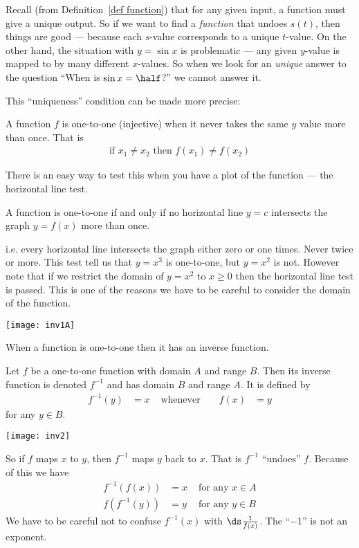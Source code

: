 Recall (from Definition~\ref{def function}) that for any given input, a function must
give a unique output. So if we want to find a \emph{function} that undoes $s(t)$, then
things are good --- because each $s$-value corresponds to a unique $t$-value. On the
other hand, the situation with $y=\sin x$ is problematic --- any given $y$-value is
mapped to by many different $x$-values. So when we look for an \emph{unique} answer to
the question ``When is $\sin x = \half$?'' we cannot answer it.

This ``uniqueness'' condition can be made more precise:
\begin{defn}\label{def_0_6_1}
 A function $f$ is one-to-one (injective) when it never takes the same $y$
value more than once. That is
\begin{align*}
  \mbox{if } x_1 \neq x_2 \mbox{ then } f(x_1) \neq f(x_2)
\end{align*}
\end{defn}
There is an easy way to test this when you have a plot of the function --- the
horizontal line test.
\begin{defn}\label{def_0_6_2}
 A function is one-to-one if and only if no horizontal line $y=c$ intersects
the graph $y=f(x)$ more than once.
\end{defn}
\noindent i.e. every horizontal line intersects the graph either zero or
one times. Never twice or more. This test tell us that $y=x^3$ is
one-to-one, but $y=x^2$ is not. However note that if we restrict the domain of
$y=x^2$ to $x \geq 0$ then the horizontal line test is passed. This is one of
the reasons we have to be careful to consider the domain of the function.
\begin{fig}
\begin{center}
 \texttt{[image: inv1A]}
\end{center}
\end{fig}

When a function is one-to-one then it has an inverse function.
\begin{defn}\label{def inv func}
 Let $f$ be a one-to-one function with domain $A$ and range $B$. Then its inverse
function is denoted $f^{-1}$ and has domain $B$ and range $A$. It is defined by
\begin{align*}
  f^{-1}(y) &= x & \text{ whenever }&& f(x)&=y
\end{align*}
for any $y \in B$.
\begin{efig}
\begin{center}
 \texttt{[image: inv2]}
\end{center}
\end{efig}
\end{defn}
So if $f$ maps $x$ to $y$, then $f^{-1}$ maps $y$ back to $x$. That is $f^{-1}$ ``undoes''
$f$. Because of this we have
\begin{align*}
  f^{-1}( f(x) ) &= x  &\mbox{ for any $x \in A$}\\
   f( f^{-1}(y) )&=y &\mbox{ for any $y \in B$}
\end{align*}
We have to be careful not to confuse $f^{-1}(x)$ with $\ds \frac{1}{f(x)}$. The ``$-1$''
is not an exponent.

